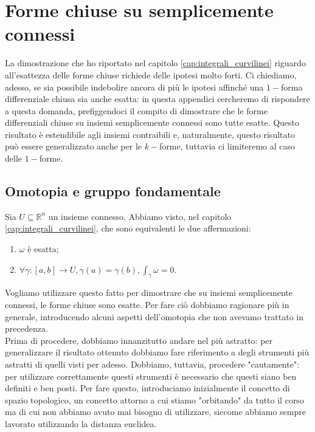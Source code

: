 \chapter{Forme chiuse su semplicemente connessi}
\pagestyle{plain}
\thispagestyle{empty}
\pagestyle{fancy}

La dimostrazione che ho riportato nel capitolo \ref{cap:integrali_curvilinei} riguardo all'esattezza delle forme chiuse richiede delle ipotesi molto forti. Ci chiediamo, adesso, se sia possibile indebolire ancora di
più le ipotesi affinché una $1-$forma differenziale chiusa sia anche esatta: in questa appendici cercheremo di rispondere a questa domanda, prefiggendoci il compito di dimostrare che le forme differenziali chiuse su insiemi semplicemente connessi sono tutte esatte. 
Questo risultato è estendibile agli insiemi contraibili e, naturalmente, questo risultato può essere generalizzato anche per le $k-$forme, tuttavia ci limiteremo al caso delle $1-$forme.

\section{Omotopia e gruppo fondamentale}

Sia $U \subseteq \mathbb{R}^n$ un insieme connesso. Abbiamo visto, nel capitolo \ref{cap:integrali_curvilinei}, che sono equivalenti le due affermazioni:
\begin{enumerate}[label=\protect\circled{\arabic*}] 
    \item $\omega$ è esatta;
    \item $\forall \gamma: [a, b] \to U, \gamma(a) = \gamma(b), \int_\gamma \omega = 0$.
\end{enumerate} 
Vogliamo utilizzare questo fatto per dimostrare che su insiemi semplicemente connessi, le forme chiuse sono esatte. Per fare ciò dobbiamo ragionare più in generale, introducendo alcuni aspetti dell'omotopia che
non avevamo trattato in precedenza. \\

Prima di procedere, dobbiamo innanzitutto andare nel più astratto: per generalizzare il risultato ottenuto dobbiamo fare riferimento a degli strumenti più astratti di quelli visti per adesso. Dobbiamo, tuttavia, procedere
"cautamente": per utilizzare correttamente questi strumenti è necessario che questi siano ben definiti e ben posti. Per fare questo, introduciamo inizialmente il concetto di spazio topologico, un concetto attorno a cui stiamo
"orbitando" da tutto il corso ma di cui non abbiamo avuto mai bisogno di utilizzare, siccome abbiamo sempre lavorato utilizzando la distanza euclidea. 

